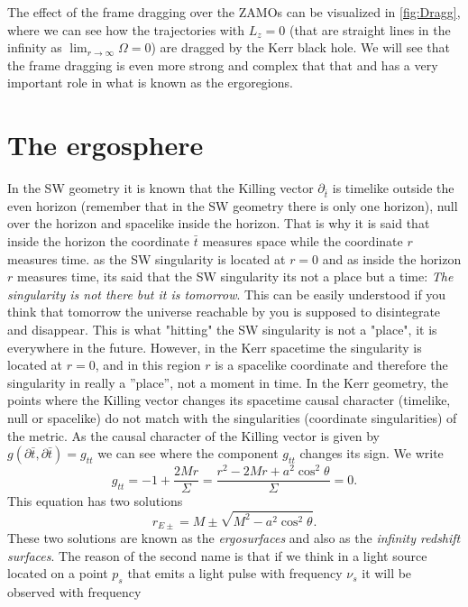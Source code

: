 The effect of the frame dragging over the \gls{ZAMO}s can be visualized in \cref{fig:Dragg}, where we can see how the trajectories with $L_z=0$ (that are straight lines in the infinity as $\lim_{r\to\infty} \Omega=0$) are dragged by the Kerr black hole. We will see that the frame dragging is even more strong and complex that that and has a very important role in what is known as the ergoregions.

\section{The ergosphere}

In the \gls{SW} geometry it is known that the Killing vector $\partial_{\bar{t}}$ is timelike outside the even horizon (remember that in the \gls{SW} geometry there is only one horizon), null over the horizon and spacelike inside the horizon. That is why it is said that inside the horizon the coordinate $\bar{t}$ measures space while the coordinate $r$ measures time. as the \gls{SW} singularity is located at $r=0$ and as inside the horizon $r$ measures time, its said that the \gls{SW} singularity its not a place but a time: \textit{The singularity is not there but it is tomorrow}. This can be easily understood if you think that tomorrow the universe reachable by you is supposed to disintegrate and disappear. This is what "hitting" the \gls{SW} singularity is not a "place", it is everywhere in the future. However, in the Kerr spacetime the singularity is located at $r=0$, and in this region $r$ is a spacelike coordinate and therefore the singularity in really a ''place'', not a moment in time. In the Kerr geometry, the points where the Killing vector changes its spacetime causal character (timelike, null or spacelike) do not match with the singularities (coordinate singularities) of the metric. As the causal character of the Killing vector is given by$g(\partial{\bar{t}},\partial{\bar{t}})=g_{tt}$ we can see where the component $g_{tt}$ changes its sign. We write
\begin{equation}
 g_{tt}=-1+\frac{2M r}{\Sigma}=\frac{r^2-2M r+a^2 \cos^2 \theta}{\Sigma}=0.
\end{equation}
This equation has two solutions
\begin{equation}
 r_{E\pm}=M \pm \sqrt{M^2-a^2 \cos^2\theta}.
\end{equation}
These two solutions are known as the \textit{ergosurfaces} and also as the \textit{infinity redshift surfaces}. The reason of the second name is that if we think in a light source located on a point $p_s$ that emits a light pulse with frequency $\nu_s$ it will be observed with frequency
